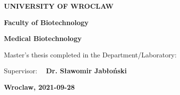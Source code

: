 \documentclass[fontsize=12pt,headsepline=true, bibliography=totocnumbered, twoside]{scrbook} %
\begin{document}
\begin{titlepage}
    \begin{center}
         \vspace*{1cm}   
        \Huge
        \textbf{UNIVERSITY OF WROCLAW}     
        
        
        \LARGE
        \textbf{Faculty of Biotechnology}

		\Large
		\textbf{Medical Biotechnology}
            
        \vspace{3.5cm}
            
       {} %
       
       \vspace{1.5cm}
       
       {} %
            
        \vspace{4cm}

{\Large  Master's thesis completed in the Department/Laboratory:}



{\color {Blue}{\Large \bfseries Department of Biotransformation}} %

\Large Supervisor:{\color {Blue} \Large \bfseries  ~ Dr. Sławomir Jabłoński} %
   
\vspace{3.5cm}

\LARGE \bfseries Wroclaw, 2021-09-28   %
       
           
\end{center}            
    
\end{titlepage} 
 








\frontmatter   %
\end{document}
